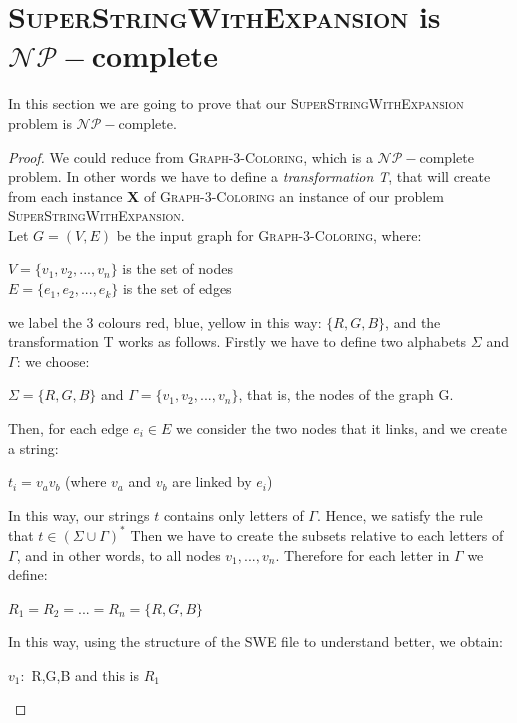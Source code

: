 \documentclass[paper=a4, fontsize=11pt]{scrartcl}
\numberwithin{equation}{section}		%
\numberwithin{figure}{section}			%
\numberwithin{table}{section}				%
\begin{document}
\section{\textsc{SuperStringWithExpansion} is $\mathcal{NP}-$complete}
In this section we are going to prove that our \textsc{SuperStringWithExpansion} problem is $\mathcal{NP}-$complete. 
\begin{proof}
     We could reduce from \textsc{Graph-3-Coloring}, which is a $\mathcal{NP}-$complete problem. In other words we have to define a \textit{transformation T}, that will create from each instance \textbf{X} of \textsc{Graph-3-Coloring} an instance of our problem \textsc{SuperStringWithExpansion}. \newline
     \\
     Let $G=(V,E)$ be the input graph for \textsc{Graph-3-Coloring}, where:
     \begin{center}
     	$V=\{v_1,v_2,...,v_n\}$ is the set of nodes \\
     	$E=\{e_1,e_2,...,e_k\}$ is the set of edges
     \end{center}
     we label the 3 colours red, blue, yellow in this way: $\{R,G,B\}$, and the transformation T works as follows. \newline
     Firstly we have to define two alphabets $\Sigma$ and $\Gamma$: we choose:
     \begin{center}
     	$\Sigma=\{R,G,B\}$ and $\Gamma=\{v_1,v_2,...,v_n\}$, that is, the nodes of the graph G.
     \end{center}
     Then, for each edge $e_i\in E$ we consider the two nodes that it links, and we create a string:
     \begin{center}
     	$t_i=v_av_b$ (where $v_a$ and $v_b$ are linked by $e_i$)  
     \end{center}
     In this way, our strings $t$ contains only letters of $\Gamma$. Hence, we satisfy the rule that $t \in (\Sigma \cup \Gamma)^*$ \newline
     Then we have to create the subsets relative to each letters of $\Gamma$, and in other words, to all nodes $v_1,...,v_n$.
     Therefore for each letter in $\Gamma$ we define:
     \begin{center}
     	$R_1=R_2=...=R_n=\{R,G,B\}$
     \end{center}
     In this way, using the structure of the SWE file to understand better, we obtain:
     \begin{center}
     	$v_1:$ \textsc{R,G,B} and this is $R_1$ \\

\end{center}
\end{proof}
\end{document}
